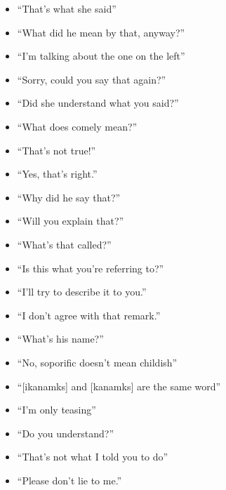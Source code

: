 \documentclass[]{article}
\providecommand{\tightlist}{%
  \setlength{\itemsep}{0pt}\setlength{\parskip}{0pt}}
\begin{document}
\begin{itemize}
\tightlist
\item
  ``That's what she said''
\item
  ``What did he mean by that, anyway?''
\item
  ``I'm talking about the one on the left''
\item
  ``Sorry, could you say that again?''
\item
  ``Did she understand what you said?''
\item
  ``What does comely mean?''
\item
  ``That's not true!''
\item
  ``Yes, that's right.''
\item
  ``Why did he say that?''
\item
  ``Will you explain that?''
\item
  ``What's that called?''
\item
  ``Is this what you're referring to?''
\item
  ``I'll try to describe it to you.''
\item
  ``I don't agree with that remark.''
\item
  ``What's his name?''
\item
  ``No, soporific doesn't mean childish''
\item
	``{[}ikanamks{]} and {[}kanamks{]} are the same word''
\item
  ``I'm only teasing''
\item
  ``Do you understand?''
\item
  ``That's not what I told you to do''
\item
  ``Please don't lie to me.''
\end{itemize}
\end{document}
